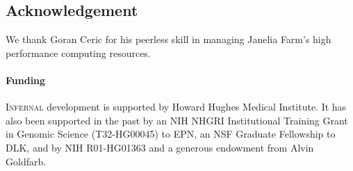 \documentclass{bioinfo}
\begin{document}
\begin{application}
\begin{table}[!t]
%
{}{}
\end{table}

\section*{Acknowledgement}

We thank Goran Ceric for his peerless skill in managing Janelia Farm's
high performance computing resources.

\paragraph{Funding\textcolon} 
\textsc{Infernal} development is supported by Howard Hughes Medical
Institute. It has also been supported in the past by an NIH NHGRI
Institutional Training Grant in Genomic Science (T32-HG00045) to EPN,
an NSF Graduate Fellowship to DLK, and by NIH R01-HG01363 and a
generous endowment from Alvin Goldfarb. 

%
%

%


\end{application}
\end{document}
